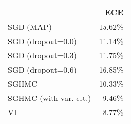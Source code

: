 \begin{tabular}{lr}
\toprule
{} &    ECE \\
\midrule
SGD (MAP)              & 15.62\% \\
SGD (dropout=0.0)      & 11.14\% \\
SGD (dropout=0.3)      & 11.75\% \\
SGD (dropout=0.6)      & 16.85\% \\
SGHMC                  & 10.33\% \\
SGHMC (with var. est.) &  9.46\% \\
VI                     &  8.77\% \\
\bottomrule
\end{tabular}
